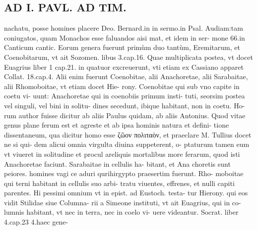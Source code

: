 \documentclass{article}
\begin{document}
\begin{pages}
\section*{AD I. PAVL. AD TIM. }
\marginpar{[ p.218 ]}\pstart nachatu, posse homines placere Deo. Bernard.in in sermo.in Psal. Audiam:tam coniugatos, quam Monachos esse faluandos aisi mat, et idem in ser- mone 66.in Canticum cantic.  \pend\pstart Eorum genera fuerunt primùm duo tantùm, Eremitarum, et Coenobitarum, vt ait Sozomen. libus 3.cap.16. Quae multiplicata postea, vt docet Euagrius liber 1 cap.21. in quatuor excreuerunt, vti etiam ex Cassiano apparet Collat. 18.cap.4. Alii enim fuerunt Coenobitae, alii Anachoretae, alii Sarabaitae, alii Rhomoboitae, vt etiam docet Hie- rony. Coenobitae qui sub vno capite in coetu vi- uunt: Anachoretae qui in coenobiis primum insti- tuti, seorsim postea vel singuli, vel bini in solitu- dines secedunt, ibique habitant, non in coetu. Ho- rum author fuisse dicitur ab aliis Paulus quidam, ab aliis Antonius. Quod vitae genus plane ferum est et agreste et ab ipsa hominis natura et defini- tione dissentaneum, qua dicitur homo esse ζῶον πολιταὸν, et praeclare M. Tullius docet ne si qui- dem alicui omnia virgulta diuina suppeterent, o- ptaturum tamen eum vt viueret in solitudine et procul areliquis mortalibus more ferarum, quod isti Anachoretae faciunt. Sarabaitae in cellulis ha- bitant, et Ana choretis sunt peiores. homines vagi ce aduri qurihirgypto praesertim fuerunt. Rho- moboitae qui terni habitant in cellulis suo arbi- tratu viuentes, effrenes, et nulli capiti parentes. Hi pessimi omnium vt in epist. ad Eustoch. testa- tur Hierony. qui eos vidit Stilidae siue Columna- rii a Simeone instituti, vt ait Euagrius, qui in co- lumnis habitant, vt nec in terra, nec in coelo vi- uere videantur. Socrat. liber 4.cap.23 4.haec gene-  \pend

\end{pages}
\end{document}
